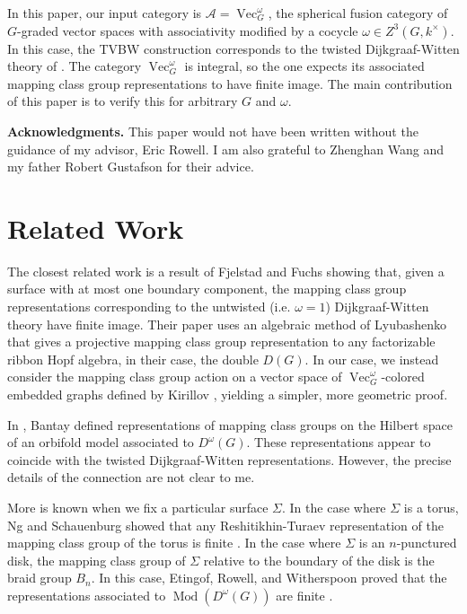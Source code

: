 \documentclass{amsart}
\DeclareMathOperator{\Mod}{Mod}
\DeclareMathOperator{\Vect}{Vec}
\newcommand{\Si}{\Sigma}
\begin{document}
In this paper, our input category is  $\mathcal A = \Vect_G^\omega$, the spherical fusion category of $G$-graded vector spaces with associativity modified by a cocycle $\omega \in Z^3(G, k^\times)$.  In this case, the TVBW construction corresponds to the twisted Dijkgraaf-Witten theory of \cite{dijkgraaf1990}.  The category $\Vect_G^\omega$ is integral, so the one expects its associated mapping class group representations to have finite image.  The main contribution of this paper is to verify this for arbitrary $G$ and $\omega$.

\textbf{Acknowledgments.}  This paper would not have been written without the guidance of my advisor, Eric Rowell.  I am also grateful to Zhenghan Wang and my father Robert Gustafson for their advice.

\section{Related Work}

The closest related work is a result of Fjelstad and Fuchs \cite{fjfu} showing that, given a surface with at most one boundary component, the mapping class group representations corresponding to the untwisted (i.e. $\omega = 1$) Dijkgraaf-Witten theory have finite image.  Their paper uses an algebraic method of Lyubashenko \cite{Lyubashenko1996} that gives a projective mapping class group representation to any factorizable ribbon Hopf algebra, in their case, the double $D(G)$. In our case, we instead consider the mapping class group action on a vector space of $\Vect_G^\omega$-colored embedded graphs defined by Kirillov \cite{kirillovStringNets}, yielding a simpler, more geometric proof.

In \cite{bantay}, Bantay defined representations of mapping class groups on the Hilbert space of an orbifold model associated to $D^\omega(G)$.  These representations appear to coincide with the twisted Dijkgraaf-Witten representations. However, the precise details of the connection are not clear to me.

More is known when we fix a particular surface $\Si$. In the case where $\Si$ is a torus, Ng and Schauenburg showed that any Reshitikhin-Turaev representation of the mapping class group of the torus is finite \cite{0806.2493}.   In the case where $\Si$ is an $n$-punctured disk, the mapping class group of $\Si$ relative to the boundary of the disk is the braid group $B_n$.  In this case, Etingof, Rowell, and Witherspoon proved that the representations associated to $\Mod(D^\omega(G))$ are finite \cite{erw}.
\end{document}
